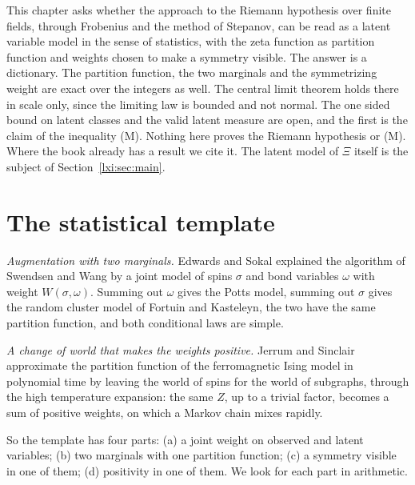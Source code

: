 
This chapter asks whether the approach to the Riemann hypothesis over finite fields, through Frobenius and the method of Stepanov, can be read as a latent variable model in the sense of statistics, with the zeta function as partition function and weights chosen to make a symmetry visible. The answer is a dictionary. The partition function, the two marginals and the symmetrizing weight are exact over the integers as well. The central limit theorem holds there in scale only, since the limiting law is bounded and not normal. The one sided bound on latent classes and the valid latent measure are open, and the first is the claim of the inequality (M). Nothing here proves the Riemann hypothesis or (M). Where the book already has a result we cite it. The latent model of $\Xi$ itself is the subject of Section~\ref{lxi:sec:main}.

\section{The statistical template}\label{lvz:sec:template}

\emph{Augmentation with two marginals.} Edwards and Sokal \cite{EdwardsSokal88} explained the algorithm of Swendsen and Wang by a joint model of spins $\sigma$ and bond variables $\omega$ with weight $W(\sigma,\omega)$. Summing out $\omega$ gives the Potts model, summing out $\sigma$ gives the random cluster model of Fortuin and Kasteleyn, the two have the same partition function, and both conditional laws are simple.

\emph{A change of world that makes the weights positive.} Jerrum and Sinclair \cite{JerrumSinclair93} approximate the partition function of the ferromagnetic Ising model in polynomial time by leaving the world of spins for the world of subgraphs, through the high temperature expansion: the same $Z$, up to a trivial factor, becomes a sum of positive weights, on which a Markov chain mixes rapidly.

So the template has four parts: (a) a joint weight on observed and latent variables; (b) two marginals with one partition function; (c) a symmetry visible in one of them; (d) positivity in one of them. We look for each part in arithmetic.

